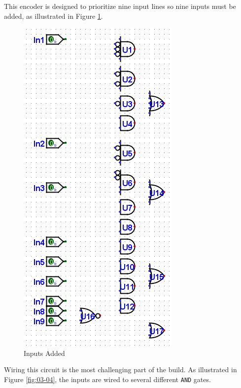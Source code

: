 This encoder is designed to prioritize nine input lines so nine inputs must be added, as illustrated in Figure \ref{fig:03-03}.

\begin{figure}[H]
	\centering
	\includegraphics[width=\maxwidth{.95\linewidth}]{gfx/03-03}
	\caption{Inputs Added}
	\label{fig:03-03}
\end{figure}

Wiring this circuit is the most challenging part of the build. As illustrated in Figure \ref{fig:03-04}, the inputs are wired to several different \texttt{AND} gates.


